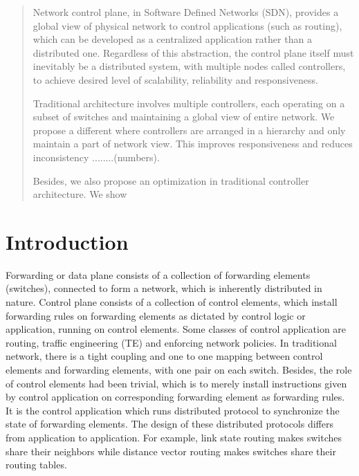 \documentclass[10pt, twocolumn]{article}
\begin{document}
\maketitle
\begin{abstract}
Network control plane, in Software Defined Networks (SDN), provides a global view of physical network to control applications (such as routing), which can be developed as a centralized application rather than a distributed one. Regardless of this abstraction, the control plane itself must inevitably be a distributed system, with multiple nodes called controllers, to achieve desired level of scalability, reliability and responsiveness. 

Traditional architecture involves multiple controllers, each operating on a subset of switches and maintaining a global view of entire network. We propose a different where controllers are arranged in a hierarchy and only maintain a part of network view. This improves responsiveness and reduces inconsistency ........(numbers).

Besides, we also propose an optimization in traditional controller architecture. We show 
\end{abstract}

\section{Introduction}
Forwarding or data plane consists of a collection of forwarding elements (switches), connected to form a network, which is inherently distributed in nature. Control plane consists of a collection of control elements, which install forwarding rules on forwarding elements as dictated by control logic or application, running on control elements. Some classes of control application are routing, traffic engineering (TE) and enforcing network policies. In traditional network, there is a tight coupling and one to one mapping between control elements and forwarding elements, with one pair on each switch. Besides, the role of control elements had been trivial, which is to merely install instructions given by control application on corresponding forwarding element as forwarding rules. It is the control application which runs distributed protocol to synchronize the state of forwarding elements. The design of these distributed protocols differs from application to application. For example, link state routing makes switches share their neighbors while distance vector routing makes switches share their routing tables.
\end{document}

